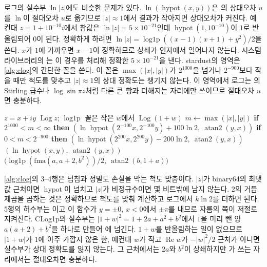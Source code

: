 로그의 실수부 $\ln|z|$에도 비슷한 문제가 있다. $\ln(\operatorname{hypot}(x,y))$은 의 상대오차 $u$를 $\ln$이 절대오차 $u$로 옮기므로 $|z|\approx1$에서 결과가 작아지면 상대오차가 커진다. 예컨대 $z=1+10^{-10}i$에서 참값은 $\ln|z|=5\times10^{-21}$인데 $\operatorname{hypot}(1,10^{-10})$이 $1$로 반올림되어 $0$이 된다. 정확하게 하려면 $\ln|z|=\operatorname{log1p}((x-1)(x+1)+y^2)/2$을 쓴다. $x$가 $1$에 가까우면 $x-1$이 정확하므로 상쇄가 인자에서 일어나지 않는다. 시스템 라이브러리의 는 이 경우를 처리해 정확한 $5\times10^{-21}$을 낸다. stardust의  영역은 \cref{alg:clog}의 간단한 꼴을 쓴다. 이 꼴은 $\max(|x|,|y|)$가 $2^{1000}$을 넘거나 $2^{-900}$보다 작을 때만 척도를 맞추고 $|z|\approx1$의 상대 정확도는 챙기지 않는다. 이 영역에서 로그는 의 Stirling 급수나 $\log\sin\pi z$처럼 다른 큰 항과 더해지는 자리에만 쓰이므로 절대오차 $u$면 충분하다.

\begin{algorithm}[htbp]
\begin{algorithmic}[1]
\Require $z=x+iy$
\Ensure $\operatorname{Log}z$; $\operatorname{log1p}$ 꼴은 작은 $w$에서 $\operatorname{Log}(1+w)$
  \State $m\gets\max(|x|,|y|)$
  \State \textbf{if} $2^{1000}<m<\infty$ \textbf{then} \Return $(\ln\operatorname{hypot}(2^{-100}x,2^{-100}y)+100\ln2,\ \operatorname{atan2}(y,x))$
  \State \textbf{if} $0<m<2^{-900}$ \textbf{then} \Return $(\ln\operatorname{hypot}(2^{200}x,2^{200}y)-200\ln2,\ \operatorname{atan2}(y,x))$
  \State \Return $(\ln\operatorname{hypot}(x,y),\ \operatorname{atan2}(y,x))$ 
\EndFunction
{}
  \State \Return $\bigl(\operatorname{log1p}(\mathrm{fma}(a,a+2,b^2))/2,\ \operatorname{atan2}(b,1+a)\bigr)$ 
\EndFunction
\end{algorithmic}
\caption{주가지 로그와 $\operatorname{Log}(1+w)$ (stardust 의 , )}
\label{alg:clog}
\end{algorithm}

\cref{alg:clog}의 3--4행은 넘침과 정밀도 손실을 막는 척도 맞춤이다. $|z|$가 binary64의 최댓값 근처이면 $\operatorname{hypot}$이 넘치고 $|z|$가 비정규수이면 몇 비트밖에 남지 않는다. $2$의 거듭제곱을 곱하는 것은 정확하므로 척도를 맞춰 계산하고 로그에서 $k\ln2$를 더하면 된다. 5행의 허수부는 이고 이 함수가 $y=\pm0$, $x<0$에서 $\pm\pi$를 내므로 자름의 쪽이 저절로 지켜진다. \textrm{CLog1p}의 실수부는 $|1+w|^2=1+2a+a^2+b^2$에서 $1$을 미리 뺀 양 $a(a+2)+b^2$을  하나로 만들어 에 넘긴다. $1+w$를 반올림하는 일이 없으므로 $|1+w|$가 $1$에 아주 가깝지 않은 한, 예컨대 $w$가 작고 $\operatorname{Re}w$가 $-|w|^2/2$ 근처가 아니면 실수부가 상대 정확도를 잃지 않는다. 그 근처에서는 $2a$와 $b^2$이 상쇄하지만 가 쓰는 자리에서는 절대오차면 충분하다.

